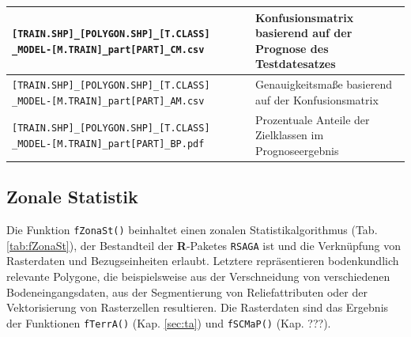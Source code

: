 \begin{table}[p]
\begin{tabularx}{\textwidth}{X|X}
		\texttt{[TRAIN.SHP]\_[POLYGON.SHP]\_[T.CLASS] \_MODEL-[M.TRAIN]\_part[PART]\_CM.csv} & Konfusionsmatrix basierend auf der Prognose des Testdatesatzes\\\midrule
		\texttt{[TRAIN.SHP]\_[POLYGON.SHP]\_[T.CLASS] \_MODEL-[M.TRAIN]\_part[PART]\_AM.csv} & Genauigkeitsmaße basierend auf der Konfusionsmatrix\\\midrule
        \texttt{[TRAIN.SHP]\_[POLYGON.SHP]\_[T.CLASS] \_MODEL-[M.TRAIN]\_part[PART]\_BP.pdf} & Prozentuale Anteile der Zielklassen im Prognoseergebnis\\\bottomrule
		\end{tabularx}%
	\label{tab:fClasP}%
\end{table}




\subsection{Zonale Statistik}
Die Funktion \texttt{fZonaSt()} beinhaltet einen zonalen Statistikalgorithmus (Tab. \ref{tab:fZonaSt}), der Bestandteil der 
 \textbf{R}-Paketes \texttt{RSAGA} \citep{Brenning-etal2018} ist und die Verknüpfung von Rasterdaten und Bezugseinheiten erlaubt. Letztere repräsentieren bodenkundlich relevante Polygone, die beispielsweise aus der Verschneidung von verschiedenen Bodeneingangsdaten, aus der Segmentierung von Reliefattributen oder der Vektorisierung von Rasterzellen resultieren. Die Rasterdaten sind das Ergebnis der Funktionen \texttt{fTerrA()} (Kap. \ref{sec:ta}) und \texttt{fSCMaP()} (Kap. ???). 

